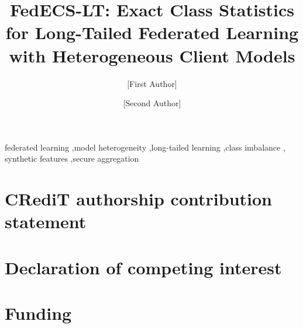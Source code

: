 \documentclass[preprint,12pt]{elsarticle}
\begin{document}

\begin{frontmatter}
\title{FedECS-LT: Exact Class Statistics for Long-Tailed Federated Learning with Heterogeneous Client Models}

\author[aff1]{[First Author]}
\ead{[email]}
\author[aff1]{[Second Author]}

\begin{abstract}

\end{abstract}



\begin{keyword}
federated learning \sep model heterogeneity \sep long-tailed learning \sep class imbalance \sep
synthetic features \sep secure aggregation
\end{keyword}
\end{frontmatter}










\section*{CRediT authorship contribution statement}
\CreditText

\section*{Declaration of competing interest}
\CompetingText

\section*{Funding}
\FundingText
\end{document}
